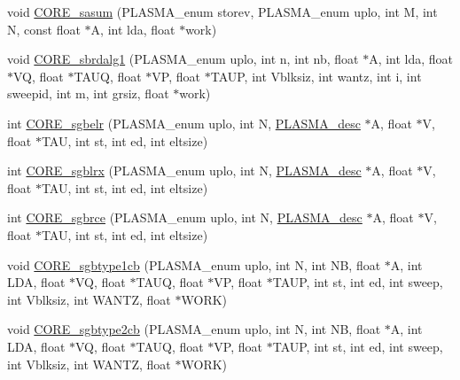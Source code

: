 \begin{DoxyCompactItemize}
\item 
void \hyperlink{group__CORE__float_ga0e75dc69bd43361d0f427d9b9894f3ea_ga0e75dc69bd43361d0f427d9b9894f3ea}{C\+O\+R\+E\+\_\+sasum} (P\+L\+A\+S\+M\+A\+\_\+enum storev, P\+L\+A\+S\+M\+A\+\_\+enum uplo, int M, int N, const float $\ast$A, int lda, float $\ast$work)
\item 
void \hyperlink{group__CORE__float_gaa4aa0ab3003d3164bed0654c76e917e2_gaa4aa0ab3003d3164bed0654c76e917e2}{C\+O\+R\+E\+\_\+sbrdalg1} (P\+L\+A\+S\+M\+A\+\_\+enum uplo, int n, int nb, float $\ast$A, int lda, float $\ast$V\+Q, float $\ast$T\+A\+U\+Q, float $\ast$V\+P, float $\ast$T\+A\+U\+P, int Vblksiz, int wantz, int i, int sweepid, int m, int grsiz, float $\ast$work)
\item 
int \hyperlink{group__CORE__float_ga3a0cc53c85e047800b9b7aba09a9aac9_ga3a0cc53c85e047800b9b7aba09a9aac9}{C\+O\+R\+E\+\_\+sgbelr} (P\+L\+A\+S\+M\+A\+\_\+enum uplo, int N, \hyperlink{structplasma__desc__t}{P\+L\+A\+S\+M\+A\+\_\+desc} $\ast$A, float $\ast$V, float $\ast$T\+A\+U, int st, int ed, int eltsize)
\item 
int \hyperlink{group__CORE__float_gad46f7973397586421a97735fcbd1fdc1_gad46f7973397586421a97735fcbd1fdc1}{C\+O\+R\+E\+\_\+sgblrx} (P\+L\+A\+S\+M\+A\+\_\+enum uplo, int N, \hyperlink{structplasma__desc__t}{P\+L\+A\+S\+M\+A\+\_\+desc} $\ast$A, float $\ast$V, float $\ast$T\+A\+U, int st, int ed, int eltsize)
\item 
int \hyperlink{group__CORE__float_ga9af91d5f9b246b63117af6fe63eb3964_ga9af91d5f9b246b63117af6fe63eb3964}{C\+O\+R\+E\+\_\+sgbrce} (P\+L\+A\+S\+M\+A\+\_\+enum uplo, int N, \hyperlink{structplasma__desc__t}{P\+L\+A\+S\+M\+A\+\_\+desc} $\ast$A, float $\ast$V, float $\ast$T\+A\+U, int st, int ed, int eltsize)
\item 
void \hyperlink{group__CORE__float_ga82f67b17967b6b6c76bf8791b94bedc6_ga82f67b17967b6b6c76bf8791b94bedc6}{C\+O\+R\+E\+\_\+sgbtype1cb} (P\+L\+A\+S\+M\+A\+\_\+enum uplo, int N, int N\+B, float $\ast$A, int L\+D\+A, float $\ast$V\+Q, float $\ast$T\+A\+U\+Q, float $\ast$V\+P, float $\ast$T\+A\+U\+P, int st, int ed, int sweep, int Vblksiz, int W\+A\+N\+T\+Z, float $\ast$W\+O\+R\+K)
\item 
void \hyperlink{group__CORE__float_ga16aec6063ed2de3c51bd3bb023cf4ad8_ga16aec6063ed2de3c51bd3bb023cf4ad8}{C\+O\+R\+E\+\_\+sgbtype2cb} (P\+L\+A\+S\+M\+A\+\_\+enum uplo, int N, int N\+B, float $\ast$A, int L\+D\+A, float $\ast$V\+Q, float $\ast$T\+A\+U\+Q, float $\ast$V\+P, float $\ast$T\+A\+U\+P, int st, int ed, int sweep, int Vblksiz, int W\+A\+N\+T\+Z, float $\ast$W\+O\+R\+K)

\end{DoxyCompactItemize}

